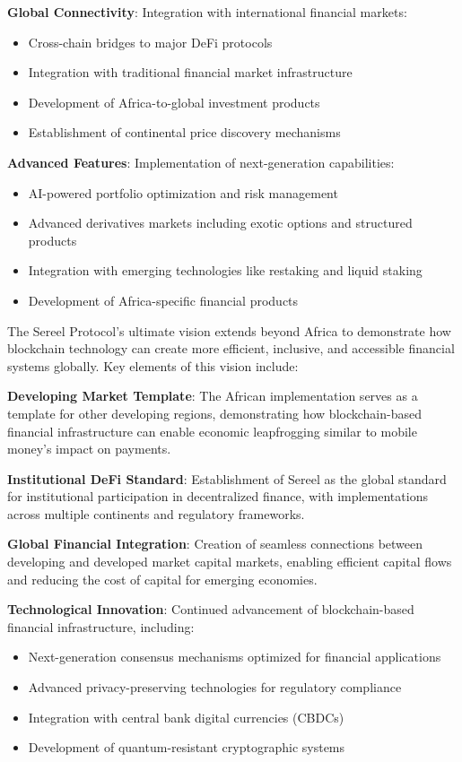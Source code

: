 \documentclass[12pt]{article}
\begin{document}
\textbf{Global Connectivity}: Integration with international financial markets:
\begin{itemize}
	\item Cross-chain bridges to major DeFi protocols
	\item Integration with traditional financial market infrastructure
	\item Development of Africa-to-global investment products
	\item Establishment of continental price discovery mechanisms

\end{itemize}
\textbf{Advanced Features}: Implementation of next-generation capabilities:
\begin{itemize}
	\item AI-powered portfolio optimization and risk management
	\item Advanced derivatives markets including exotic options and structured products
	\item Integration with emerging technologies like restaking and liquid staking
	\item Development of Africa-specific financial products

\end{itemize}

The Sereel Protocol's ultimate vision extends beyond Africa to demonstrate how blockchain technology can create more efficient, inclusive, and accessible financial systems globally. Key elements of this vision include:

\textbf{Developing Market Template}: The African implementation serves as a template for other developing regions, demonstrating how blockchain-based financial infrastructure can enable economic leapfrogging similar to mobile money's impact on payments.

\textbf{Institutional DeFi Standard}: Establishment of Sereel as the global standard for institutional participation in decentralized finance, with implementations across multiple continents and regulatory frameworks.

\textbf{Global Financial Integration}: Creation of seamless connections between developing and developed market capital markets, enabling efficient capital flows and reducing the cost of capital for emerging economies.

\textbf{Technological Innovation}: Continued advancement of blockchain-based financial infrastructure, including:
\begin{itemize}
	\item Next-generation consensus mechanisms optimized for financial applications
	\item Advanced privacy-preserving technologies for regulatory compliance
	\item Integration with central bank digital currencies (CBDCs)
	\item Development of quantum-resistant cryptographic systems

\end{itemize}
\end{document}

